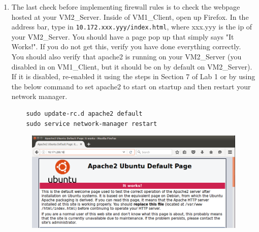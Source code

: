 \begin{enumerate}
\item The last check before implementing firewall rules is to check the webpage hosted at your VM2\_Server. Inside of VM1\_Client, open up Firefox. In the address bar, type in {\tt 10.172.xxx.yyy/index.html}, where xxx.yyy is the ip of your VM2\_Server. You should have a page pop up that simply says "It Works!". If you do not get this, verify you have done everything correctly. You should also verify that apache2 is running on your VM2\_Server (you disabled in on VM1\_Client, but it should be on by default on VM2\_Server). If it is disabled, re-enabled it using the steps in Section 7 of Lab 1 or by using the below command to set apache2 to start on startup and then restart your network manager.
\begin{verbatim}
    sudo update-rc.d apache2 default
    sudo service network-manager restart
\end{verbatim}
\begin{figure}[htb]
        \centering
        \includegraphics*[width=.6\textwidth]{Figs/web.png}
\end{figure}
\end{enumerate}
\newpage
